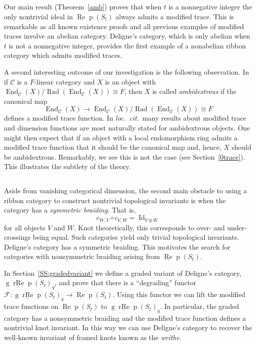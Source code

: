 \documentclass[12pt, reqno]{amsart}
\theoremstyle{definition}
\newcommand{\End}{\operatorname{End}}
\def\uRep{\underline{\operatorname{Re}}\!\operatorname{p}}
\newcommand{\F}{\mathcal{F}}
\renewcommand{\1}{_{(1)}}
\renewcommand{\2}{_{(2)}}
\newcommand{\3}{_{(3)}}
\newcommand{\4}{_{(4)}}
\newcommand{\cat}{\mathcal{C}}
\def\gruRep{\operatorname{g}\!\underline{\operatorname{rRe}}\!\operatorname{p}}
\newcommand{\Id}{\operatorname{Id}}
\begin{document}
\subsection{} Our main result (Theorem~\ref{amb}) proves that when $t$ is a nonnegative integer the only nontrivial ideal in $\uRep(S_t)$ always admits a modified trace.  This is remarkable as all known existence proofs and all previous examples of modified traces involve an abelian category.  Deligne's category, which is only abelian when $t$ is not a nonnegative integer, provides the first example of a nonabelian ribbon category which admits modified traces.  

A second interesting outcome of our investigation is the following observation.  In \cite{GKP} if $\cat$ is a $F$-linear category and $X$ is an object with $\End_{\cat}(X)/\operatorname{Rad}\left(\End_{\cat}(X) \right) \cong F$, then $X$ is called \emph{ambidextrous} if the canonical map 
\[
\End_{\cat}(X) \to \End_{\cat}(X)/\operatorname{Rad}\left(\End_{\cat}(X) \right) \cong F
\] defines a modified trace function.  In \emph{loc.\ cit.\ }many results about modified trace and dimension functions are most naturally stated for ambidextrous objects.  One might then expect that if an object with a local endomorphism ring admits a modified trace function that it should be the canonical map and, hence, $X$ should be ambidextrous.  Remarkably, we see this is not the case (see Section~\ref{0trace}).  This illustrates the subtlety of the theory.

\subsection{}  Aside from vanishing categorical dimension, the second main obstacle to using a ribbon category to construct nontrivial topological invariants is when the category has a \emph{symmetric braiding}.  That is,  
\[
c_{W,V} \circ c_{V,W} = \Id_{V \otimes W}
\] for all objects $V$ and $W$.  Knot theoretically, this corresponds to over- and under-crossings being equal.  Such categories yield only trivial topological invariants.  Deligne's category has a symmetric braiding.  This motivates the search for categories with nonsymmetric braiding arising from $\uRep (S_{t})$.

In Section~\ref{SS:gradedvariant} we define a graded variant of Deligne's category, $\gruRep (S_{t})_{q}$, and prove that there is a ``degrading'' functor $\F: \gruRep (S_{t})_{q} \to \uRep (S_{t})$.  Using this functor we can lift the modified trace functions on $\uRep (S_{t})$ to $\gruRep (S_{t})_{q}$.  In particular, the graded category has a nonsymmetric braiding and the modified trace function defines a nontrivial knot invariant.  In this way we can use Deligne's category to recover the well-known invariant of framed knots known as the \emph{writhe}.  
\end{document}
